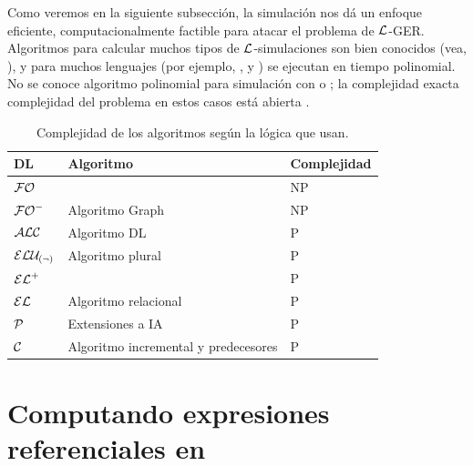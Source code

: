\begin{table}[t]
Como veremos en la siguiente subsecci\'on, la simulaci\'on nos d\'a un
enfoque eficiente, computacionalmente factible para atacar el problema de $\mathcal{L}$-GER. Algoritmos para calcular muchos tipos de $\mathcal{L}$-simulaciones son
bien conocidos (vea, \cite{hopc:algo71,areces08,HHK95,dovier04:_effic_algor_for_comput_bisim_equiv}), y para muchos
lenguajes (por ejemplo, \ALC, \ELAN y \EL) se ejecutan en tiempo polinomial. No se conoce algoritmo polinomial 
 para simulaci\'on con \FOL o \EPFOL; la complejidad exacta 
complejidad del problema en estos casos est\'a abierta \cite{gare:comp79}.\\

\begin{tabular}{|l|l|l|}
\hline
  DL & Algoritmo  & Complejidad \\  \hline
  $\mathcal{FO}$   &  																		 & NP\\ \hline
  ${\mathcal{FO}^-}$ & Algoritmo Graph \cite{graph}   & NP\\ \hline 
  $\mathcal{ALC}$   & Algoritmo DL \cite{areces08} & P\\ \hline
 	$\mathcal{ELU_{(\neg)} }$ & Algoritmo plural \cite{gardent02:_gener_minim_defin_descr} &P\\ \hline
  ${\mathcal{EL}^+}$ & &P\\ \hline
	$\mathcal{EL}$   & Algoritmo relacional &P\\ \hline
	$\mathcal{P}$ &  Extensiones a IA \cite{deemter02:CL}&P\\ \hline
	$\mathcal{C}$ & Algoritmo incremental y predecesores \cite{incremental} &P\\ 
	
\hline	
\end{tabular}

\caption{Complejidad de los algoritmos seg\'un la l\'ogica que usan.}\label{tab:algoritmos-complejidad}
\end{table}


\section{Computando expresiones referenciales en \EL}\label{sec:simulation}
\label{sec:greViaSimulacion}

